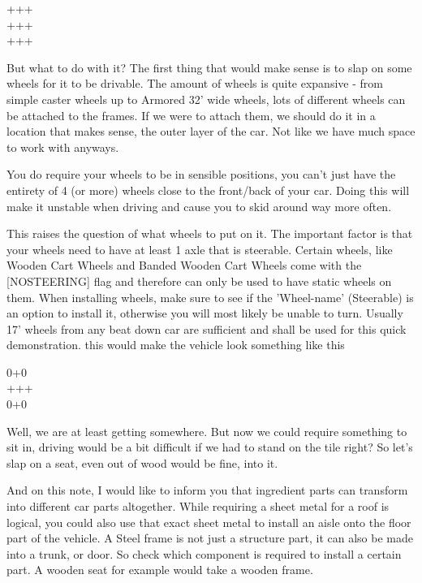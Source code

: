 \documentclass[11pt]{report}
\begin{document}
\begin{spacing}{0.75}
+++\\
+++\\
+++
\end{spacing}

But what to do with it? The first thing that would make sense is to slap on some wheels for it to be drivable. The amount of wheels is quite expansive - from simple caster wheels up to Armored 32' wide wheels, lots of different wheels can be attached to the frames. If we were to attach them, we should do it in a location that makes sense, the outer layer of the car. Not like we have much space to work with anyways.

You do require your wheels to be in sensible positions, you can't just have the entirety of 4 (or more) wheels close to the front/back of your car. Doing this will make it unstable when driving and cause you to skid around way more often.

This raises the question of what wheels to put on it. The important factor is that your wheels need to have at least 1 axle that is steerable. Certain wheels, like Wooden Cart Wheels and Banded Wooden Cart Wheels come with the [NOSTEERING] flag and therefore can only be used to have static wheels on them. When installing wheels, make sure to see if the 'Wheel-name' (Steerable) is an option to install it, otherwise you will most likely be unable to turn. Usually 17' wheels from any beat down car are sufficient and shall be used for this quick demonstration.
this would make the vehicle look something like this

\vspace{0.5\baselineskip}
\begin{spacing}{0.75}
0+0\\
+++\\
0+0
\end{spacing}
\vspace{0.5\baselineskip}

Well, we are at least getting somewhere. But now we could require something to sit in, driving would be a bit difficult if we had to stand on the tile right? So let's slap on a seat, even out of wood would be fine, into it.

And on this note, I would like to inform you that ingredient parts can transform into different car parts altogether. While requiring a sheet metal for a roof is logical, you could also use that exact sheet metal to install an aisle onto the floor part of the vehicle. A Steel frame is not just a structure part, it can also be made into a trunk, or door. So check which component is required to install a certain part. A wooden seat for example would take a wooden frame.
\end{document}
